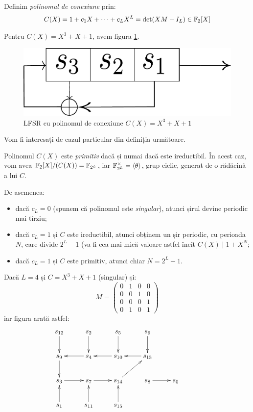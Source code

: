 Definim \emph{polinomul de conexiune} prin:
\[
  C(X) = 1 + c_1 X + \dots + c_L X^L = \det(XM - I_L) \in \mathbb{F}_2[X]
\]

\begin{example}
  Pentru $ C(X) = X^3 + X + 1 $, avem figura \ref{fig:lfsr1}.
  \begin{figure}[!htbp]
    \centerline{
      \includegraphics[scale=0.3]{imgs/lfsr1.pdf}
    }
    \caption{LFSR cu polinomul de conexiune $ C(X) = X^3 + X + 1 $}
    \label{fig:lfsr1}
  \end{figure}
\end{example}

Vom fi interesați de cazul particular din definiția următoare.

\begin{definition}\label{def:pol-prim}
  Polinomul $ C(X) $ este \emph{primitiv} dacă și numai dacă este ireductibil.
  În acest caz, vom avea $ \mathbb{F}_2[X]/(C(X)) = \mathbb{F}_{2^L} $, iar
  $ \mathbb{F}_{2^L}^\times = \langle \theta \rangle $, grup ciclic, generat de
  o rădăcină a lui $ C $.
\end{definition}

De asemenea:
\begin{itemize}
\item dacă $ c_L = 0 $ (spunem că polinomul este \emph{singular}),
  atunci șirul devine periodic mai tîrziu;
\item dacă $ c_L = 1 $ și $ C $ este ireductibil, atunci obținem
  un șir periodic, cu perioada $ N $, care divide $ 2^L - 1 $ (va
  fi cea mai mică valoare astfel încît $ C(X) \mid 1 + X^N $;
\item dacă $ c_L = 1 $ și $ C $ este primitiv, atunci chiar $ N = 2^L - 1 $.
\end{itemize}

\begin{example}
  Dacă $ L = 4 $ și $ C = X^3 + X + 1 $ (singular) și:
  \[
    M = \begin{pmatrix}
      0 & 1 & 0 & 0 \\
      0 & 0 & 1 & 0 \\
      0 & 0 & 0 & 1 \\
      0 & 1 & 0 & 1
    \end{pmatrix}
  \]
  iar figura arată astfel:
  \[
    \xymatrix{
      s_{12} \ar[d] & s_2 \ar[d] & s_5 \ar[d] & s_6 \ar[d] & & \\
      s_9 \ar[d] & s_4 \ar[l] & s_{10} \ar[l] & s_{13} \ar[l] & & \\
      s_3 \ar[r] & s_7 \ar[r] & s_{14} \ar[ur] & s_8 \ar[r] & s_0 \\
      s_1 \ar[u] & s_{11} \ar[u] & s_{15} \ar[u] & & &
    }
  \]
\end{example}

